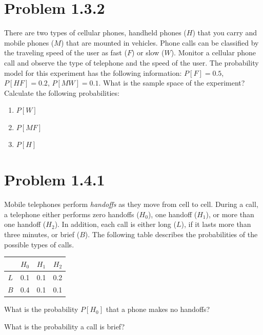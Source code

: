 \documentclass{article}
\begin{document}
\newpage

\section*{Problem 1.3.2}
There are two types of cellular phones, handheld phones ($H$) that you carry and mobile phones ($M$) that are mounted in vehicles. Phone calls can be classified by the traveling speed of the user as fast ($F$) or slow ($W$). Monitor a cellular phone call and observe the type of telephone and the speed of the user. The probability model for this experiment has the following information: $P[F] = 0.5$, $P[HF] = 0.2$, $P[MW] = 0.1$. What is the sample space of the experiment? Calculate the following probabilities:

\begin{enumerate}[label=(\alph*)]
    \item $P[W]$
    \vspace{1.5in}
    \item $P[MF]$
    \vspace{1.5in}
    \item $P[H]$
    \vspace{1.5in}
\end{enumerate}

\newpage

\section*{Problem 1.4.1}
Mobile telephones perform \textit{handoffs} as they move from cell to cell. During a call, a telephone either performs zero handoffs ($H_0$), one handoff ($H_1$), or more than one handoff ($H_2$). In addition, each call is either long ($L$), if it lasts more than three minutes, or brief ($B$). The following table describes the probabilities of the possible types of calls.

\begin{center}
\begin{tabular}{c|ccc}
 & $H_0$ & $H_1$ & $H_2$ \\
\hline
$L$ & 0.1 & 0.1 & 0.2 \\
$B$ & 0.4 & 0.1 & 0.1
\end{tabular}
\end{center}

\noindent
What is the probability $P[H_0]$ that a phone makes no handoffs?
\vspace{1.5in}

\noindent
What is the probability a call is brief?
\vspace{1.5in}
\end{document}
